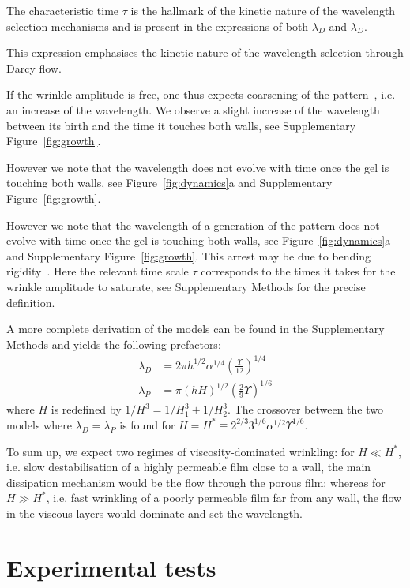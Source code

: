 \documentclass[twocolumn,superscriptaddress,showpacs,preprintnumbers,
amsmath,amssymb,prl]{revtex4-1}
\begin{document}
The characteristic time $\tau$ is the hallmark of the kinetic nature of the wavelength selection mechanisms and is present in the expressions of both $\lambda_D$ and $\lambda_D$. 

This expression emphasises the kinetic nature of the wavelength selection through Darcy flow. 



If the wrinkle amplitude is free, one thus expects coarsening of the pattern~\cite{Yoo2003}, i.e. an increase of the wavelength. We observe a slight increase of the wavelength between its birth and the time it touches both walls, see Supplementary Figure~\ref{fig:growth}.


However we note that the wavelength does not evolve with time once the gel is touching both walls, see Figure~\ref{fig:dynamics}a and Supplementary Figure~\ref{fig:growth}.


However we note that the wavelength of a generation of the pattern does not evolve with time once the gel is touching both walls, see Figure~\ref{fig:dynamics}a and Supplementary Figure~\ref{fig:growth}. This arrest may be due to bending rigidity~\cite{LeGoff2014}. Here the relevant time scale $\tau$ corresponds to the times it takes for the wrinkle amplitude to saturate, see Supplementary Methods for the precise definition.


A more complete derivation of the models can be found in the Supplementary Methods and yields the following prefactors:
\begin{align}
\lambda_D &= 2\pi h^{1/2}\alpha^{1/4}\left(\frac{\Upsilon}{12}\right)^{1/4}\\
\lambda_P &= \pi (hH)^{1/2}\left(\frac{2}{9}\Upsilon\right)^{1/6}
\end{align}
where $H$ is redefined by $1/H^3 = 1/H_1^3 + 1/H_2^3$. The crossover between the two models where $\lambda_D=\lambda_P$ is found for $H = H^* \equiv 2^{2/3} 3^{1/6} \alpha^{1/2} \Upsilon^{1/6}$.

To sum up, we expect two regimes of viscosity-dominated wrinkling: for $H\ll H^*$, i.e. slow destabilisation of a highly permeable film close to a wall, the main dissipation mechanism would be the flow through the porous film; whereas for $H\gg H^*$, i.e. fast wrinkling of a poorly permeable film far from any wall, the flow in the viscous layers would dominate and set the wavelength.

\section*{Experimental tests}
\end{document}
